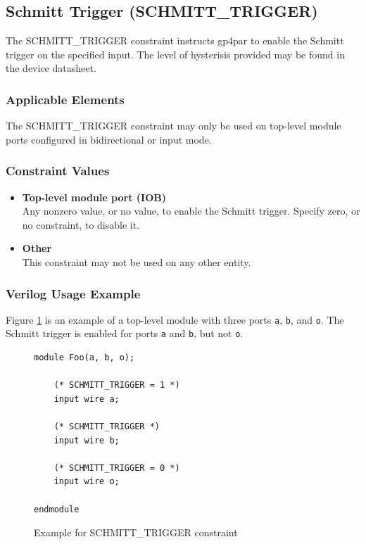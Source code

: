 \documentclass[11pt]{article}
\begin{document}

\pagebreak
\subsection{Schmitt Trigger (SCHMITT\_TRIGGER)}

The SCHMITT\_TRIGGER constraint instructs gp4par to enable the Schmitt trigger on the specified input. The level 
of hysterisis provided may be found in the device datasheet.

\subsubsection{Applicable Elements}
The SCHMITT\_TRIGGER constraint may only be used on top-level module ports configured in bidirectional or input mode. 

\subsubsection{Constraint Values}
\begin{itemize}
\item {\bfseries Top-level module port (IOB)}\\
Any nonzero value, or no value, to enable the Schmitt trigger. Specify zero, or no constraint, to disable it.
\item {\bfseries Other} \\
This constraint may not be used on any other entity.
\end{itemize}

\subsubsection{Verilog Usage Example}

Figure \ref{constraint-schmitt} is an example of a top-level module with three ports \texttt{a}, \texttt{b}, and
\texttt{o}. The Schmitt trigger is enabled for ports  \texttt{a} and \texttt{b}, but not \texttt{o}.

\begin{figure}[h]
\begin{lstlisting}
module Foo(a, b, o);

	(* SCHMITT_TRIGGER = 1 *)
	input wire a;

	(* SCHMITT_TRIGGER *)
	input wire b;

	(* SCHMITT_TRIGGER = 0 *)
	input wire o;
	
endmodule
\end{lstlisting}
\caption{Example for SCHMITT\_TRIGGER constraint}
\label{constraint-schmitt}
\end{figure}
\end{document}
